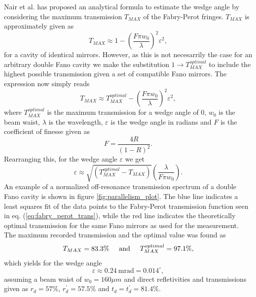Nair et al. \cite{Nair} has proposed an analytical formula to estimate the wedge angle by considering the maximum transmission $T_{MAX}$ of the Fabry-Perot fringes. $T_{MAX}$ is approximately given as 
\begin{equation}
    T_{MAX} \approx 1 - \left(\frac{F \pi w_0}{\lambda}\right)^2 \varepsilon^2,
\end{equation}
for a cavity of identical mirrors. However, as this is not necesarrily the case for an arbitrary double Fano cavity we make the substitution $1 \rightarrow T_{MAX}^{optimal}$ to include the highest possible transmission given a set of compatible Fano mirrors. The expression now simply reads
\begin{equation}
    T_{MAX} \approx T_{MAX}^{optimal} - \left(\frac{F \pi w_0}{\lambda}\right)^2 \varepsilon^2,
\end{equation}
where $T_{MAX}^{optimal}$ is the maximum transmission for a wedge angle of $0$, $w_0$ is the beam waist, $\lambda$ is the wavelength, $\varepsilon$ is the wedge angle in radians and $F$ is the coefficient of finesse \cite{Pedrotti} given as
\begin{equation}
    F = \frac{4R}{(1-R)^2}.
\end{equation}
Rearranging this, for the wedge angle $\varepsilon$ we get
\begin{equation}
    \varepsilon \approx \sqrt{\left(T_{MAX}^{optimal} - T_{MAX} \right)} \left(\frac{\lambda}{F \pi w_0}\right).
\end{equation}
An example of a normalized off-resonance transmission spectrum of a double Fano cavity is shown in figure \ref{fig:parallelism_plot}. The blue line indicates a least squares fit of the data points to the Fabry-Perot transmission function seen in eq. (\ref{eq:fabry_perot_trans}), while the red line indicates the theoretically optimal transmission for the same Fano mirrors as used for the measurement. The maximum recorded transmission and the optimal value was found as
\begin{equation}
    T_{MAX} = 83.3\% \hspace{0.5cm} \text{and} \hspace{0.5cm} T_{MAX}^{optimal} = 97.1\%,
\end{equation}
which yields for the wedge angle 
\begin{equation}
    \varepsilon \approx 0.24 \: \text{mrad} = 0.014^{\circ},
\end{equation}
assuming a beam waist of $w_0 = 160 \mu m$ and direct refletivities and transmissions given as $r_d = 57\%$, $r_d^{\prime} = 57.5\%$ and $t_d = t_d^{\prime} = 81.4\%$.

